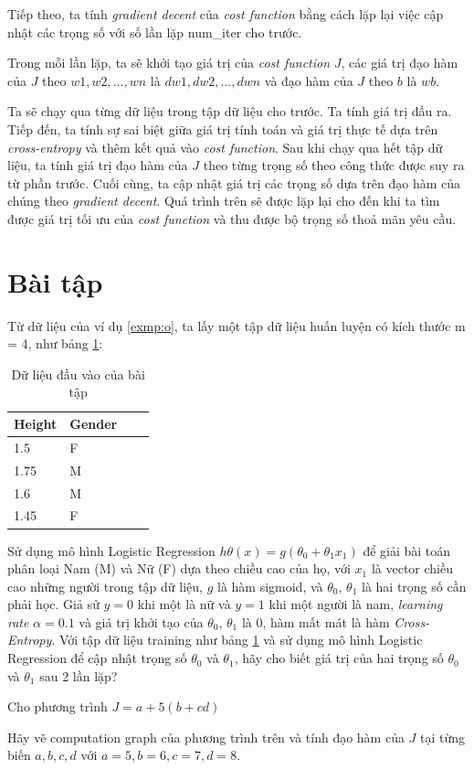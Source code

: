Tiếp theo, ta tính \textit{gradient decent} của \textit{cost function} bằng cách lặp lại việc cập nhật các trọng số với số lần lặp num\_iter cho trước.

Trong mỗi lần lặp, ta sẽ khởi tạo giá trị của \textit{cost function} $J$, các giá trị đạo hàm của $J$ theo $w1, w2, ..., wn$ là $dw1, dw2, ..., dwn$ và đạo hàm của $J$ theo $b$ là $wb$.

Ta sẽ chạy qua từng dữ liệu trong tập dữ liệu cho trước. Ta tính giá trị đầu ra. Tiếp đến, ta tính sự sai biệt giữa giá trị tính toán và giá trị thực tế dựa trên \textit{cross-entropy} và thêm kết quả vào \textit{cost function}. Sau khi chạy qua hết tập dữ liệu, ta tính giá trị đạo hàm của $J$ theo từng trọng số theo công thức được suy ra từ phần trước. Cuối cùng, ta cập nhật giá trị các trọng số dựa trên đạo hàm của chúng theo \textit{gradient decent}. Quá trình trên sẽ được lặp lại cho đến khi ta tìm được giá trị tối ưu của \textit{cost function} và thu được bộ trọng số thoả mãn yêu cầu.

\newpage
\section{Bài tập}
\begin{exer}
Từ dữ liệu của ví dụ \ref{exmp:o}, ta lấy một tập dữ liệu huấn luyện có kích thước m = 4, như bảng \ref{tab:exercise}:
\begin{table}[ht]
\centering
\begin{tabular}{|l|l|l|l|}
\hline
Height & Gender \\ \hline
1.5   & F \\ \hline
1.75  & M \\ \hline
1.6     & M \\ \hline
1.45  & F  \\ \hline
\end{tabular}
\caption{Dữ liệu đầu vào của bài tập}
\label{tab:exercise}
\end{table}

Sử dụng mô hình Logistic Regression $h\theta(x) = g(\theta_0 + \theta_1x_1)$ để giải bài toán phân loại Nam (M) và Nữ (F) dựa theo chiều cao của họ, với $x_1$ là vector chiều cao những người trong tập dữ liệu, $g$ là hàm sigmoid, và $\theta_0$, $\theta_1$ là hai trọng số cần phải học. Giả sử $y = 0$ khi một là nữ và $y = 1$ khi một người là nam, \textit{learning rate} $\alpha = 0.1$ và giá trị khởi tạo của $\theta_0$, $\theta_1$ là  $0$,  hàm mất mát là hàm \textit{Cross-Entropy}. Với tập dữ liệu training như bảng \ref{tab:exercise} và sử dụng mô hình Logistic Regression để cập nhật trọng số $\theta_0$ và $\theta_1$, hãy cho biết giá trị của hai trọng số $\theta_0$ và $\theta_1$ sau 2 lần lặp?
\end{exer}

\begin{exer}
Cho phương trình $J = a + 5(b + cd)$

Hãy vẽ computation graph của phương trình trên và tính đạo hàm của $J$ tại từng biến $a, b, c, d$ với $a=5, b=6, c=7, d=8$.
\end{exer}